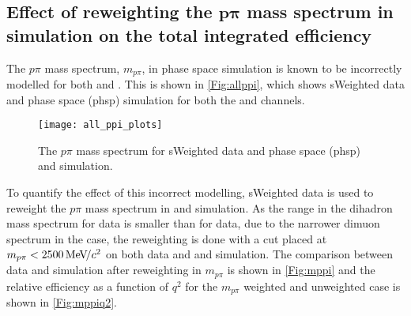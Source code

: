 


\subsection[Effect of reweighting the $p\pi$ mass  spectrum in simulation on the total integrated efficiency]{Effect of reweighting the $\mathbold{p\pi}$ mass  spectrum in simulation on the total integrated efficiency}
\label{sec:ppisys}
The $p\pi$ mass spectrum, $m_{p\pi}$, in phase space simulation is known to be incorrectly modelled for both \Lbpi and \Lbpijpsi. This is shown in \autoref{Fig:allppi}, which shows sWeighted \Lbpijpsi data and phase space (phsp) simulation for both the \Lbpi and \Lbpijpsi channels.

\begin{figure}[h!]
  \centering
  \texttt{[image: all\_ppi\_plots]}
    \caption{The $p\pi$ mass spectrum for sWeighted \Lbpijpsi data and phase space (phsp) \Lbpi and \Lbpijpsi simulation.}
  \label{Fig:allppi}

  \end{figure}


To quantify the effect of this incorrect modelling, \Lbpijpsi sWeighted data is used to reweight the $p\pi$ mass spectrum in \Lbpi and \Lbpijpsi simulation. As the range in the dihadron mass spectrum for \Lbpijpsi data is smaller than for \Lbpi data, due to the narrower dimuon spectrum in the \Lbpijpsi case, the reweighting is done with a cut placed at $m_{p\pi}<2500{\mathrm{\,Me\kern -0.1em V\!/}c^2}$  on both \Lbpijpsi data and \Lbpi and \Lbpijpsi  simulation. The comparison between \Lbpijpsi data and \Lbpi simulation after reweighting in $m_{p\pi}$ is shown in \autoref{Fig:mppi} and the relative efficiency as a function of $q^{2}$ for the $m_{p\pi}$ weighted and unweighted case is shown in \autoref{Fig:mppiq2}.

